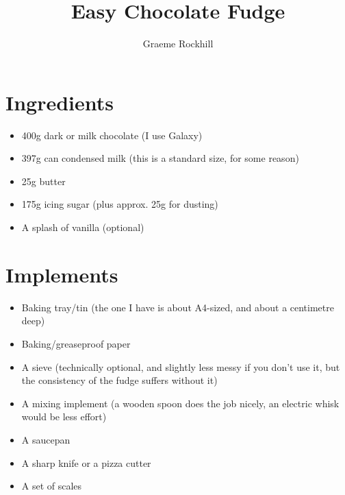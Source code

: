\documentclass[10pt,a4paper,oneside]{article}
\author{Graeme Rockhill}
\title{Easy Chocolate Fudge}
\begin{document}
\maketitle
\section{Ingredients}
\begin{itemize}

\item 400g dark or milk chocolate (I use Galaxy)
\item 397g can condensed milk (this is a standard size, for some reason)
\item 25g butter
\item 175g icing sugar (plus approx. 25g for dusting)
\item A splash of vanilla (optional)

\end{itemize}
\section{Implements}
\begin{itemize}

\item Baking tray/tin (the one I have is about A4-sized, and about a centimetre deep)
\item Baking/greaseproof paper
\item A sieve (technically optional, and slightly less messy if you don't use it, but the consistency of the fudge suffers without it)
\item A mixing implement (a wooden spoon does the job nicely, an electric whisk would be less effort)
\item A saucepan
\item A sharp knife or a pizza cutter
\item A set of scales

\end{itemize}
\end{document}
